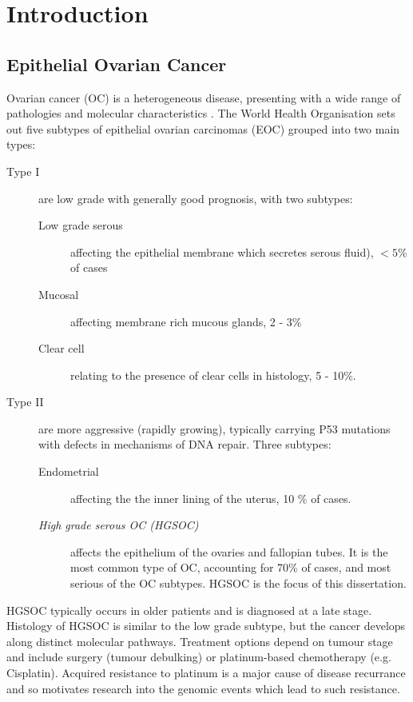 \documentclass[tikz, 11pt,a4paper,oneside,fleqn]{article}
\begin{document}
\maketitle
\newpage


\section{Introduction}

\subsection{Epithelial Ovarian Cancer}
\label{sec-epithelial-ovarian-cancer}


Ovarian cancer (OC) is a heterogeneous disease, presenting with a wide range of pathologies and molecular characteristics .  The World Health Organisation sets out five subtypes of epithelial ovarian carcinomas (EOC) grouped into two main types\cite{Kossai2018, Lisio2019}: 

\begin{description}
\item[Type I] are low grade with generally good prognosis, with two subtypes:
\begin{description}
\item[Low grade serous] affecting the epithelial membrane which secretes serous fluid), $< 5$\% of cases
\item[Mucosal] affecting membrane rich mucous glands, 2 - 3\% 
\item[Clear cell] relating to the presence of clear cells in histology, 5 - 10\%.
\end{description}
\item[Type II] are more aggressive (rapidly growing), typically carrying P53 mutations with defects in mechanisms of DNA repair. Three subtypes:
\begin{description}
\item[Endometrial] affecting the the inner lining of the uterus, 10 \% of cases.
\item[\emph{High grade serous OC (HGSOC)}] affects the epithelium of the ovaries and fallopian tubes.  It is the most common type of OC, accounting for 70\% of cases, and most serious of the OC subtypes.  HGSOC is the focus of this dissertation.
\end{description}
\end{description}

HGSOC typically occurs in older patients and is diagnosed at a late stage.   Histology of HGSOC is similar to the low grade subtype, but the cancer develops along distinct molecular pathways. 
Treatment options depend on tumour stage and include surgery (tumour debulking) or platinum-based chemotherapy (e.g. Cisplatin).  Acquired resistance to platinum is a major cause of disease recurrance\cite{Patch2015} and so motivates research into the genomic events which lead to such resistance.
\end{document}
